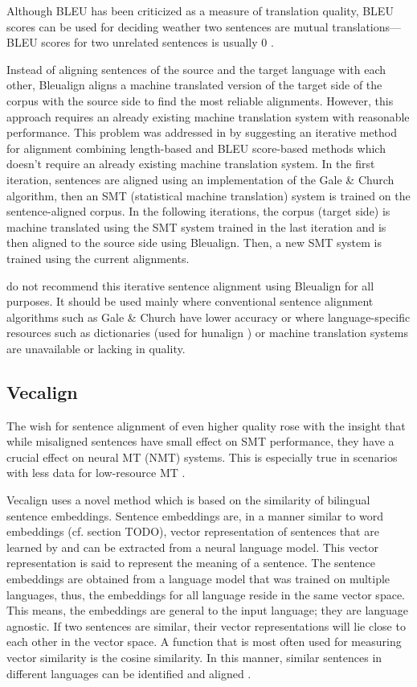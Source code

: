 Although BLEU has been criticized as a measure of translation quality, BLEU scores can be used for deciding weather two sentences are mutual translations---BLEU scores for two unrelated sentences is usually 0 \autocite{sennrich-volk-2010-mt}. 

Instead of aligning sentences of the source and the target language with each other, Bleualign aligns a machine translated version of the target side of the corpus with the source side to find the most reliable alignments. However, this approach requires an already existing machine translation system with reasonable performance. 
This problem was addressed in \cite{sennrich-volk-2011-iterative} by suggesting an iterative method for alignment combining length-based and BLEU score-based methods which doesn't require an already existing machine translation system. 
In the first iteration, sentences are aligned using an implementation of the Gale \& Church algorithm, then an SMT (statistical machine translation) system is trained on the sentence-aligned corpus. 
In the following iterations, the corpus (target side) is machine translated using the SMT system trained in the last iteration and is then aligned to the source side using Bleualign. 
Then, a new SMT system is trained using the current alignments.

\cite{sennrich-volk-2011-iterative} do not recommend this iterative sentence alignment using Bleualign for all purposes. 
It should be used mainly where conventional sentence alignment algorithms such as Gale \& Church have lower accuracy or where language-specific resources such as dictionaries (used for hunalign \autocite{hunalign}) or machine translation systems are unavailable or lacking in quality.

\subsection{Vecalign}
The wish for  sentence alignment of even higher quality rose with the insight that while misaligned sentences have small effect on SMT performance, they have a crucial effect on neural MT (NMT) systems. 
This is especially true in scenarios with less data for low-resource MT \autocite{thompson-koehn-2019-vecalign}. 

Vecalign uses a novel method which is based on the similarity of bilingual sentence embeddings. 
Sentence embeddings are, in a manner similar to word embeddings (cf. section TODO), vector representation of sentences that are learned by and can be extracted from a neural language model. 
This vector representation is said to represent the meaning of a sentence. 
The sentence embeddings are obtained from a language model that was trained on multiple languages, thus, the embeddings for all language reside in the same vector space.
This means, the embeddings are general to the input language; they are language agnostic.
If two sentences are similar, their vector representations will lie close to each other in the vector space. 
A function that is most often used for measuring vector similarity is the cosine similarity.
In this manner, similar sentences in different languages can be identified and aligned \autocite{artexte-schwenk-2019-laser}.


